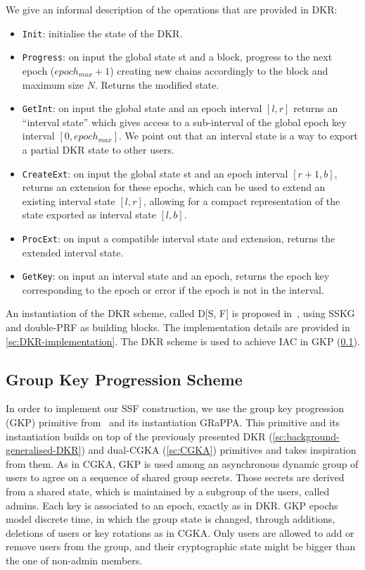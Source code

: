 We give an informal description of the operations that are provided in DKR:
\begin{itemize}
    \item \texttt{Init}: initialise the state of the DKR.
    \item \texttt{Progress}: on input the global state st and a block, progress to the next epoch ($epoch_{max} + 1$) creating new chains accordingly to the block and maximum size $N$. Returns the modified state.
    \item \texttt{GetInt}: on input the global state and an epoch interval $[l, r]$ returns an ``interval state'' which gives access to a sub-interval of the global epoch key interval $[0, epoch_{max}]$. We point out that an interval state is a way to export a partial DKR state to other users.
    \item \texttt{CreateExt}: on input the global state st and an epoch interval $[r + 1, b]$, returns
    an extension for these epochs, which can be used to extend an existing interval state $[l, r]$, allowing for a compact representation of the state exported as interval state $[l, b]$.
    \item \texttt{ProcExt}: on input a compatible interval state and extension, returns the
    extended interval state.
    \item \texttt{GetKey}: on input an interval state and an epoch, returns the epoch key corresponding to the epoch or error if the epoch is not in the interval.
\end{itemize}

An instantiation of the DKR scheme, called D[S, F] is proposed in~\cite{GKP},
using SSKG and double-PRF as building blocks. The implementation
details are provided in \cref{sc:DKR-implementation}.
The DKR scheme is used to achieve IAC in GKP (\cref{sc:gkp-scheme}).


\subsection{Group Key Progression Scheme}\label{sc:gkp-scheme}

In order to implement our SSF construction, we use the group key 
progression (GKP) primitive from~\cite{GKP} and its
instantiation GRaPPA.
This primitive and its instantiation builds on top of the previously presented DKR
(\cref{sc:background-generalised-DKR}) and dual-CGKA (\cref{sc:CGKA}) primitives
and takes inspiration from them.
As in CGKA, GKP is used among an asynchronous dynamic group of users
to agree on a sequence of shared group secrets. Those secrets
are derived from a shared state, which is maintained by a
subgroup of the users, called admins. Each key is associated to
an epoch, exactly as in DKR. GKP epochs model
discrete time, in which the group state is changed, through
additions, deletions of users or key rotations as in CGKA.
Only users are allowed to add or remove users from the group,
and their cryptographic state might be bigger than the one of
non-admin members.

